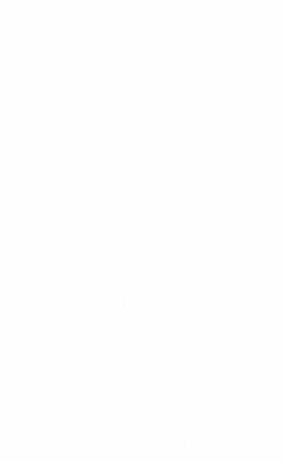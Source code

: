 \documentclass[12pt,portrait,semhelv,semrot]{article}
\begin{document}
\normalsize

\textcolor{white}{\textbf{
$$\boldsymbol{\hat{p}_1 = \frac{\mbox{\# with a degree that care a lot}}{\mbox{Total \# with a degree}}} = \frac{181}{620}$$
$$\boldsymbol{\hat{p}_2 = \frac{\mbox{\# with no degree that care a lot}}{\mbox{Total \# with no degree}}} = \frac{97}{406}$$
$$\boldsymbol{\hat{p}_1 - \hat{p}_2} = \frac{181}{620}-\frac{97}{406} = 0.053$$
$$\boldsymbol{SE(\hat{p}_1 - \hat{p}_2}) \approx 0.0280$$
$$\boldsymbol{\hat{p}_1 - \hat{p}_2}$$	
$$\boldsymbol{P(\hat{p}_1 - \hat{p}_2 < 0)}$$
$$\boldsymbol{\hat{p}}$$
$$\boldsymbol{\hat{p}_1 - \hat{p}_2\sim N\left(p_1-p_2, \frac{p_1(1-p_1)}{n_1}+\frac{p_2(1-p_2)}{n_2}\right)}$$	
$$\boldsymbol{Y = \begin{cases} 0 & \mbox{person doesn't care} \\ 1 & \mbox{person cares}\end{cases}}$$
$$\boldsymbol{Y\sim Ber(p)}$$
$$\boldsymbol{p(y) = P(Y=y) = \begin{cases} 1-p & \mbox{ if } y = 0 \\ p & \mbox{ if } y = 1\\ 0 & \mbox{otherwise}\end{cases}}$$
$$\boldsymbol{p(y) = \begin{cases} 1-p & \mbox{ if } y = 0 \\ p & \mbox{ if } y = 1\\ 0 & \mbox{otherwise}\end{cases}}$$
$$\boldsymbol{Y_i = \begin{cases} 0 & \mbox{person i doesn't care} \\ 1 & \mbox{person i cares}\end{cases}}$$
$$\boldsymbol{Y\sim Bin(5, p)}$$
$$\boldsymbol{Y\sim Bin(n, p)}$$
$$\boldsymbol{P(\mbox{1st F}\cap\mbox{2nd F}\cap\mbox{3rd F}\cap\mbox{4th F}\cap\mbox{5th F})}$$
$$\boldsymbol{P(A\cap B) = P(A)P(B)}$$
$$= \boldsymbol{P(\mbox{1st F})P(\mbox{2nd F})P(\mbox{3rd F})P(\mbox{4th F})P(\mbox{5th F})}$$
$$= \boldsymbol{(1-p)(1-p)(1-p)(1-p)(1-p) = (1-p)^5}$$
$$\boldsymbol{P(\mbox{1st S}\cap\mbox{2nd F}\cap\mbox{3rd F}\cap\mbox{4th F}\cap\mbox{5th F})}$$
$$= \boldsymbol{P(\mbox{1st S})P(\mbox{2nd F})P(\mbox{3rd F})P(\mbox{4th F})P(\mbox{5th F})}$$
$$= \boldsymbol{p(1-p)(1-p)(1-p)(1-p) = p(1-p)^4}$$
$$\boldsymbol{P(\mbox{1st S}\cap\mbox{2nd S}\cap\mbox{3rd F}\cap\mbox{4th F}\cap\mbox{5th F})}$$
$$= \boldsymbol{P(\mbox{1st S})P(\mbox{2nd S})P(\mbox{3rd F})P(\mbox{4th F})P(\mbox{5th F})}$$
$$= \boldsymbol{(p)(p)(1-p)(1-p)(1-p) = p^2(1-p)^3}$$
$$\boldsymbol{\binom{5}{2} = \frac{5!}{2!(5-2)!} = 10}$$
}}
\end{document}
